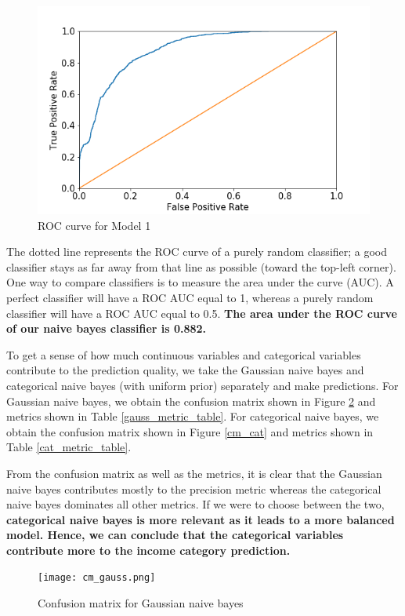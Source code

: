 \documentclass[conference]{IEEEtran}
\begin{document}
\begin{figure}[tbh]
\centering
\includegraphics[scale = 0.43]{Roccurve.png}
\caption{ROC curve for Model 1}
\label{Roccurve}
\end{figure}

The dotted line represents the ROC curve of a purely random classifier; a good classifier stays as far away from that line as possible (toward the top-left corner). One way to compare classifiers is to measure the area under the curve (AUC). A perfect classifier will have a ROC AUC equal to 1, whereas a purely random classifier will have a ROC AUC equal to 0.5. \textbf{The area under the ROC curve of our naive bayes classifier is 0.882.}

To get a sense of how much continuous variables and categorical variables contribute to the prediction quality, we take the Gaussian naive bayes and categorical naive bayes (with uniform prior) separately and make predictions. For Gaussian naive bayes, we obtain the confusion matrix shown in Figure \ref{cm_gaussian} and metrics shown in Table \ref{gauss_metric_table}. For categorical naive bayes, we obtain the confusion matrix shown in Figure \ref{cm_cat} and metrics shown in Table \ref{cat_metric_table}.

From the confusion matrix as well as the metrics, it is clear that the Gaussian naive bayes contributes mostly to the precision metric whereas the categorical naive bayes dominates all other metrics. If we were to choose between the two, \textbf{categorical naive bayes is more relevant as it leads to a more balanced model. Hence, we can conclude that the categorical variables contribute more to the income category prediction.}

\begin{figure}[tbh]
\centering
\texttt{[image: cm\_gauss.png]}
\caption{Confusion matrix for Gaussian naive bayes}
\label{cm_gaussian}
\end{figure}
\end{document}
